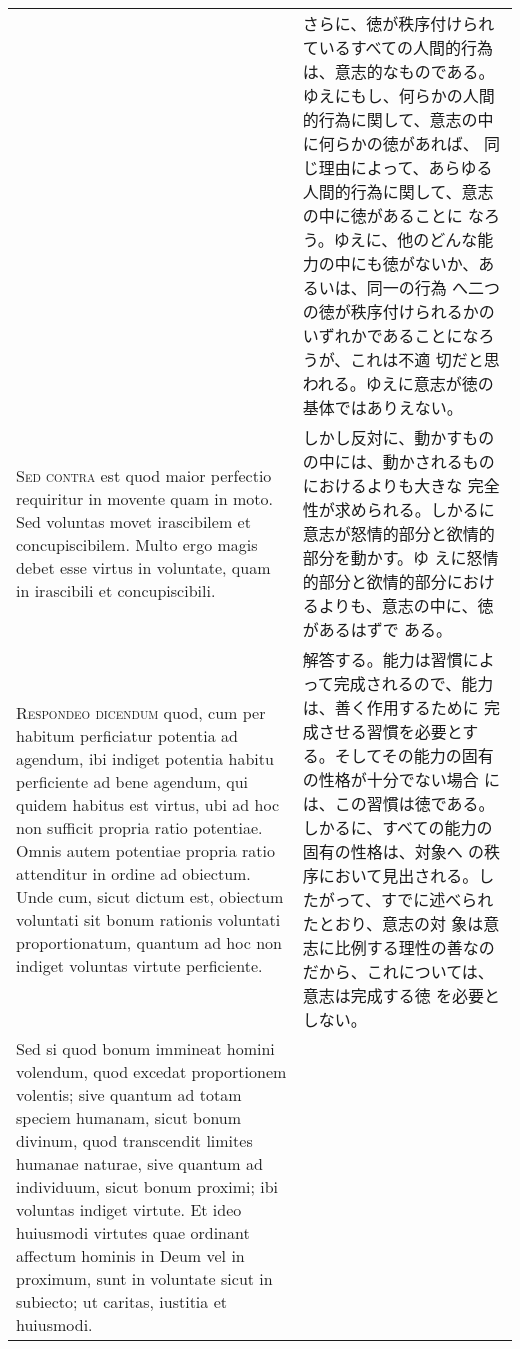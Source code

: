 \documentclass[10pt]{jsarticle}
\begin{document}
\begin{longtable}{p{21em}p{21em}}
&

さらに、徳が秩序付けられているすべての人間的行為は、意志的なものである。
ゆえにもし、何らかの人間的行為に関して、意志の中に何らかの徳があれば、
同じ理由によって、あらゆる人間的行為に関して、意志の中に徳があることに
なろう。ゆえに、他のどんな能力の中にも徳がないか、あるいは、同一の行為
へ二つの徳が秩序付けられるかのいずれかであることになろうが、これは不適
切だと思われる。ゆえに意志が徳の基体ではありえない。
 
\\



{\scshape Sed contra} est quod maior perfectio requiritur in movente
quam in moto. Sed voluntas movet irascibilem et concupiscibilem. Multo
ergo magis debet esse virtus in voluntate, quam in irascibili et
concupiscibili.


&

 しかし反対に、動かすものの中には、動かされるものにおけるよりも大きな
 完全性が求められる。しかるに意志が怒情的部分と欲情的部分を動かす。ゆ
 えに怒情的部分と欲情的部分におけるよりも、意志の中に、徳があるはずで
 ある。
 
\\



{\scshape Respondeo dicendum} quod, cum per habitum perficiatur
potentia ad agendum, ibi indiget potentia habitu perficiente ad bene
agendum, qui quidem habitus est virtus, ubi ad hoc non sufficit
propria ratio potentiae. Omnis autem potentiae propria ratio
attenditur in ordine ad obiectum. Unde cum, sicut dictum est, obiectum
voluntati sit bonum rationis voluntati proportionatum, quantum ad hoc
 non indiget voluntas virtute perficiente.


 &

解答する。能力は習慣によって完成されるので、能力は、善く作用するために
完成させる習慣を必要とする。そしてその能力の固有の性格が十分でない場合
には、この習慣は徳である。しかるに、すべての能力の固有の性格は、対象へ
の秩序において見出される。したがって、すでに述べられたとおり、意志の対
象は意志に比例する理性の善なのだから、これについては、意志は完成する徳
を必要としない。

 
 \\


 Sed si quod bonum immineat
homini volendum, quod excedat proportionem volentis; sive quantum ad
totam speciem humanam, sicut bonum divinum, quod transcendit limites
humanae naturae, sive quantum ad individuum, sicut bonum proximi; ibi
voluntas indiget virtute. Et ideo huiusmodi virtutes quae ordinant
affectum hominis in Deum vel in proximum, sunt in voluntate sicut in
subiecto; ut caritas, iustitia et huiusmodi.



\end{longtable}
\end{document}
